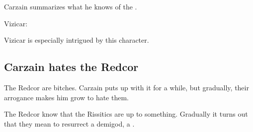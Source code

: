 \begin{garbage}
\begin{prose}
  Carzain summarizes what he knows of the \Darkfall. 
  
  Vizicar: 
  
  Vizicar is especially intrigued by this  character. 
\end{prose}







\subsection{Carzain hates the Redcor}
The Redcor are bitches. Carzain puts up with it for a while, but gradually, their arrogance makes him grow to hate them. 

The Redcor know that the Rissitics are up to something. Gradually it turns out that they mean to resurrect a \daemonic{} demigod, a \Haskelek{}. 










\end{garbage}
